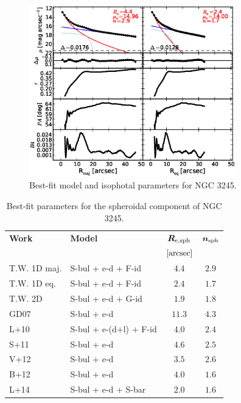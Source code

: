 \documentclass[preprint2]{emulateapj}
\newcommand{\fitfigurewidth}{0.8\textwidth}
\begin{document}
  \begin{figure}[h]
  \begin{center}
  \includegraphics[width=\fitfigurewidth]{images/n3245_1Dfit.eps}
  \caption{Best-fit model and isophotal parameters for NGC 3245.}
  \end{center}
  \end{figure}

  \begin{table}[h]
  \small
  \caption{Best-fit parameters for the spheroidal component of NGC 3245.}
  \begin{center}
  \begin{tabular}{llcc}
  \hline
  {\bf Work} & {\bf Model}   & $\bm R_{\rm e,sph}$    & $\bm n_{\rm sph}$ \\
    &  &  $[\rm arcsec]$ & \\
  \hline
  T.W. 1D maj. & S-bul + e-d + F-id & $4.4$  &  $2.9$ \\
  T.W. 1D eq.  & S-bul + e-d + F-id & $2.4$  &  $1.7$ \\
  T.W. 2D      & S-bul + e-d + G-id & $1.9$  &  $1.8$ \\
  \hline
  GD07         & S-bul + e-d		& $11.3$ &  $4.3$ \\
  L+10         & S-bul + e-(d+l) + F-id & $4.0$  &  $2.4$ \\
  S+11         & S-bul + e-d		& $4.6$  &  $2.5$ \\
  V+12         & S-bul + e-d		& $3.5$  &  $2.6$ \\
  B+12         & S-bul + e-d		& $4.0$  &  $1.6$ \\
  L+14         & S-bul + e-d + S-bar	& $2.0$  &  $1.6$ \\
  \hline
  \end{tabular}
  \end{center}
  \label{tab:n3245}
  \end{table}
\end{document}
